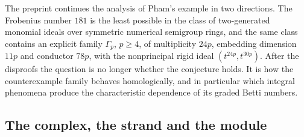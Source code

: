 \documentclass[11pt]{article}
\theoremstyle{definition}
\theoremstyle{remark}
\begin{document}
The preprint \cite{CAOSMain} continues the analysis of Pham's example in two
directions. The Frobenius number $181$ is the least possible in the class of
two-generated monomial ideals over symmetric numerical semigroup rings, and the
same class contains an explicit family $\Gamma_p$, $p\geq4$, of multiplicity
$24p$, embedding dimension $11p$ and conductor $78p$, with the nonprincipal
rigid ideal $(t^{24p},t^{30p})$. After the disproofs the question is no longer
whether the conjecture holds. It is how the counterexample family behaves
homologically, and in particular which integral phenomena produce the
characteristic dependence of its graded Betti numbers.

\subsection{The complex, the strand and the module}
\end{document}
